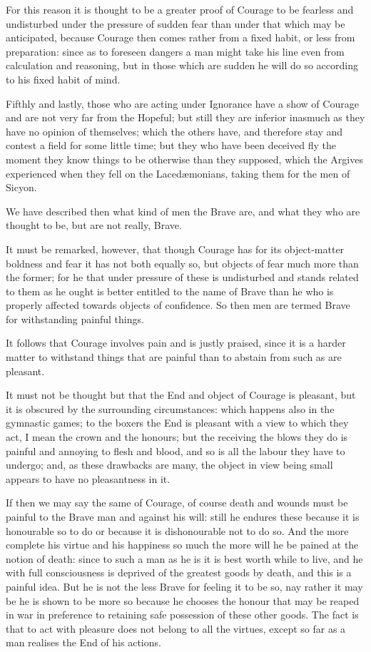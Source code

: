 For this reason it is thought to be a greater proof of Courage to be fearless
and undisturbed under the pressure of sudden fear than under that which may be
anticipated, because Courage then comes rather from a fixed habit, or less from
preparation: since as to foreseen dangers a man might take his line even from
calculation and reasoning, but in those which are sudden he will do so
according to his fixed habit of mind.

Fifthly and lastly, those who are acting under Ignorance have a show of Courage
and are not very far from the Hopeful; but still they are inferior inasmuch as
they have no opinion of themselves; which the others have, and therefore stay
and contest a field for some little time; but they who have been deceived fly
the moment they know things to be otherwise than they supposed, which the
Argives experienced when they fell on the Lacedæmonians, taking them for the
men of Sicyon.


We have described then what kind of men the Brave are, and what they who are
thought to be, but are not really, Brave.

It must be remarked, however, that though Courage has for its object-matter
boldness and fear it has not both equally so, but objects of fear much more
than the former; for he that under pressure of these is undisturbed and stands
related to them as he ought is better entitled to the name of Brave than he who
is properly affected towards objects of confidence. So then men are termed
Brave for withstanding painful things.

It follows that Courage involves pain and is justly praised, since it is a
harder matter to withstand things that are painful than to abstain from such as
are pleasant.

It must not be thought but that the End and object of Courage is pleasant, but
it is obscured by the surrounding circumstances: which happens also in the
gymnastic games; to the boxers the End is pleasant with a view to which they
act, I mean the crown and the honours; but the receiving the blows they do is
painful and annoying to flesh and blood, and so is all the labour they have to
undergo; and, as these drawbacks are many, the object in view being small
appears to have no pleasantness in it.

If then we may say the same of Courage, of course death and wounds must be
painful to the Brave man and against his will: still he endures these because
it is honourable so to do or because it is dishonourable not to do so. And the
more complete his virtue and his happiness so much the more will he be pained
at the notion of death: since to such a man as he is it is best worth while to
live, and he with full consciousness is deprived of the greatest goods by
death, and this is a painful idea. But he is not the less Brave for feeling it
to be so, nay rather it may be he is shown to be more so because he chooses the
honour that may be reaped in war in preference to retaining safe possession of
these other goods. The fact is that to act with pleasure does not belong to all
the virtues, except so far as a man realises the End of his actions.

